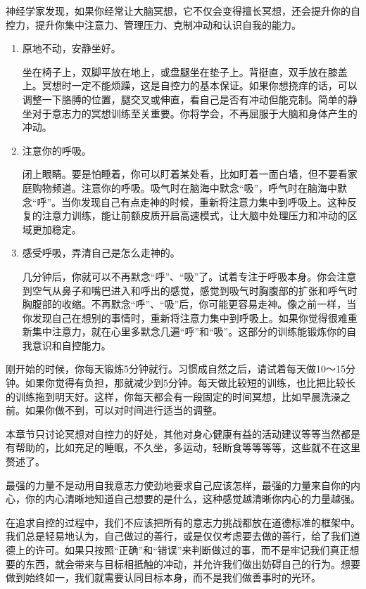 \documentclass[12pt,oneside]{book}
\begin{document}
\begin{bookref}[frametitle={\cite{自控力}}]
神经学家发现，如果你经常让大脑冥想，它不仅会变得擅长冥想，还会提升你的自控力，提升你集中注意力、管理压力、克制冲动和认识自我的能力。

\begin{enumerate}
\item 原地不动，安静坐好。

坐在椅子上，双脚平放在地上，或盘腿坐在垫子上。背挺直，双手放在膝盖上。冥想时一定不能烦躁，这是自控力的基本保证。如果你想挠痒的话，可以调整一下胳膊的位置，腿交叉或伸直，看自己是否有冲动但能克制。简单的静坐对于意志力的冥想训练至关重要。你将学会，不再屈服于大脑和身体产生的冲动。

\item 注意你的呼吸。

闭上眼睛。要是怕睡着，你可以盯着某处看，比如盯着一面白墙，但不要看家庭购物频道。注意你的呼吸。吸气时在脑海中默念“吸”，呼气时在脑海中默念“呼”。当你发现自己有点走神的时候，重新将注意力集中到呼吸上。这种反复的注意力训练，能让前额皮质开启高速模式，让大脑中处理压力和冲动的区域更加稳定。

\item 感受呼吸，弄清自己是怎么走神的。

几分钟后，你就可以不再默念“呼”、“吸”了。试着专注于呼吸本身。你会注意到空气从鼻子和嘴巴进入和呼出的感觉，感觉到吸气时胸腹部的扩张和呼气时胸腹部的收缩。不再默念“呼”、“吸”后，你可能更容易走神。像之前一样，当你发现自己在想别的事情时，重新将注意力集中到呼吸上。如果你觉得很难重新集中注意力，就在心里多默念几遍“呼”和“吸”。这部分的训练能锻炼你的自我意识和自控能力。
\end{enumerate}


刚开始的时候，你每天锻炼5分钟就行。习惯成自然之后，请试着每天做10～15分钟。如果你觉得有负担，那就减少到5分钟。每天做比较短的训练，也比把比较长的训练拖到明天好。这样，你每天都会有一段固定的时间冥想，比如早晨洗澡之前。如果你做不到，可以对时间进行适当的调整。

\end{bookref}

本章节只讨论冥想对自控力的好处，其他对身心健康有益的活动建议等等当然都是有帮助的，比如充足的睡眠，不久坐，多运动，轻断食等等等等，这些就不在这里赘述了。


最强的力量不是动用自我意志力使劲地要求自己应该怎样，最强的力量来自你的内心，你的内心清晰地知道自己想要的是什么，这种感觉越清晰你内心的力量越强。

在追求自控的过程中，我们不应该把所有的意志力挑战都放在道德标准的框架中。我们总是轻易地认为，自己做过的善行，或是仅仅考虑要去做的善行，给了我们道德上的许可。如果只按照“正确”和“错误”来判断做过的事，而不是牢记我们真正想要的东西，就会带来与目标相抵触的冲动，并允许我们做出妨碍自己的行为。想要做到始终如一，我们就需要认同目标本身，而不是我们做善事时的光环。
\end{document}
